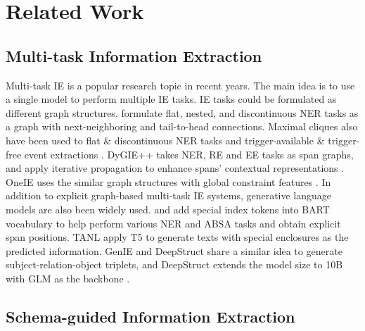 \section{Related Work}

\subsection{Multi-task Information Extraction}

Multi-task IE is a popular research topic in recent years.
The main idea is to use a single model to perform multiple IE tasks.
IE tasks could be formulated as different graph structures.
\citet{w2ner} formulate flat, nested, and discontinuous NER tasks as a graph with next-neighboring and tail-to-head connections.
Maximal cliques also have been used to flat \& discontinuous NER tasks \cite{mac-discontinuous-ner} and trigger-available \& trigger-free event extractions \cite{ptpcg}.
DyGIE++ takes NER, RE and EE tasks as span graphs, and apply iterative propagation to enhance spans' contextual representations \cite{dygiepp}.
OneIE uses the similar graph structures with global constraint features \cite{oneie}.
In addition to explicit graph-based multi-task IE systems, generative language models are also been widely used.
\citet{bart-ner} and \citet{bart-absa} add special index tokens into BART \cite{bart} vocabulary to help perform various NER and ABSA tasks and obtain explicit span positions.
TANL \cite{tanl} apply T5 \cite{t5} to generate texts with special enclosures as the predicted information.
GenIE \cite{genie} and DeepStruct \cite{deepstruct} share a similar idea to generate subject-relation-object triplets, and DeepStruct extends the model size to 10B with GLM as the backbone \cite{glm}.

\subsection{Schema-guided Information Extraction}

